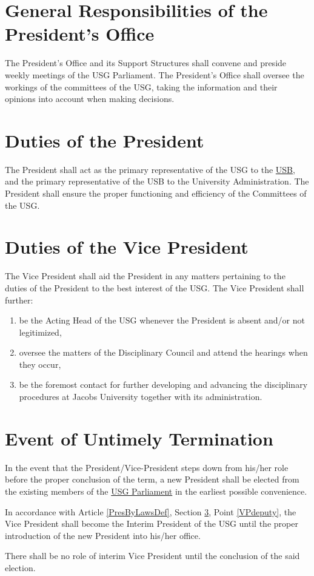 \label{PresByLawsDef}
\section{General Responsibilities of the President's Office}
The President's Office and its Support Structures shall convene and preside weekly meetings of the USG Parliament. The President's Office shall oversee the workings of the committees of the USG, taking the information and their opinions into account when making decisions.

\section{Duties of the President}
\label{PresDef}
The President shall act as the primary representative of the USG to the \hyperref[studentbody]{USB}, and the primary representative of the USB to the University Administration.
The President shall ensure the proper functioning and efficiency of the Committees of the USG.


\section{Duties of the Vice President}
\label{VPDef}
The Vice President shall aid the President in any matters pertaining to the duties of the President to the best interest of the USG. The Vice President shall further:
\begin{enumerate}
\item \label{VPdeputy} be the Acting Head of the USG whenever the President is absent and/or not legitimized,
\item oversee the matters of the Disciplinary Council and attend the hearings when they occur,
\item be the foremost contact for further developing and advancing the disciplinary procedures at Jacobs University together with its administration.
\end{enumerate}


\section{Event of Untimely Termination}
In the event that the President/Vice-President steps down from his/her role before the proper conclusion of the term, a new President shall be elected from the existing members of the \hyperref[USGParliamentDef]{USG Parliament} in the earliest possible convenience. 
\begin{parenum}
\item In accordance with Article \ref{PresByLawsDef}, Section \ref{VPDef}, Point \ref{VPdeputy}, the Vice President shall become the Interim President of the USG until the proper introduction of the new President into his/her office.
\item There shall be no role of interim Vice President until the conclusion of the said election. 
\end{parenum}